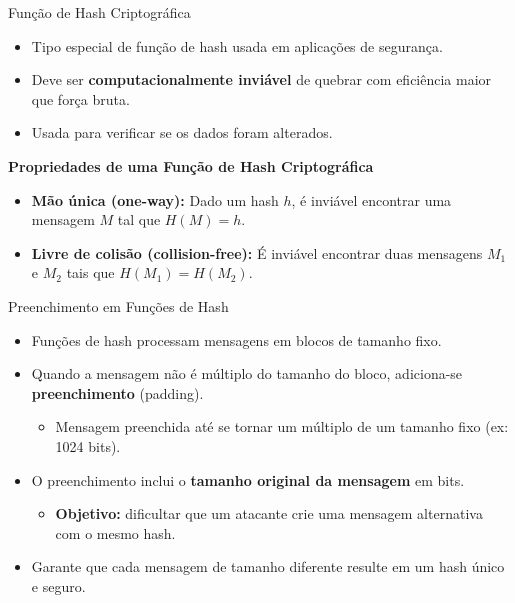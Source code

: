 \begin{frame}{Função de Hash Criptográfica}
    \begin{itemize}
        \item Tipo especial de função de hash usada em aplicações de segurança.
        \item Deve ser \textbf{computacionalmente inviável} de quebrar com eficiência maior que força bruta.
        \item Usada para verificar se os dados foram alterados.
    \end{itemize}
    \textbf{Propriedades de uma Função de Hash Criptográfica}
    \begin{itemize}
        \item \textbf{Mão única (one-way):}
              Dado um hash $h$, é inviável encontrar uma mensagem $M$ tal que $H(M) = h$.
        \item \textbf{Livre de colisão (collision-free):}
              É inviável encontrar duas mensagens $M_1$ e $M_2$ tais que $H(M_1) = H(M_2)$.
    \end{itemize}
\end{frame}

\begin{frame}{Preenchimento em Funções de Hash}
    \begin{itemize}
        \item Funções de hash processam mensagens em blocos de tamanho fixo.
        \item Quando a mensagem não é múltiplo do tamanho do bloco, adiciona-se \textbf{preenchimento} (padding).

              \begin{itemize}
                  \item Mensagem preenchida até se tornar um múltiplo de um tamanho fixo (ex: 1024 bits).
              \end{itemize}

        \item O preenchimento inclui o \textbf{tamanho original da mensagem} em bits.
              \begin{itemize}
                  \item \textbf{Objetivo:} dificultar que um atacante crie uma mensagem alternativa com o mesmo hash.
              \end{itemize}

        \item Garante que cada mensagem de tamanho diferente resulte em um hash único e seguro.
    \end{itemize}


\end{frame}

